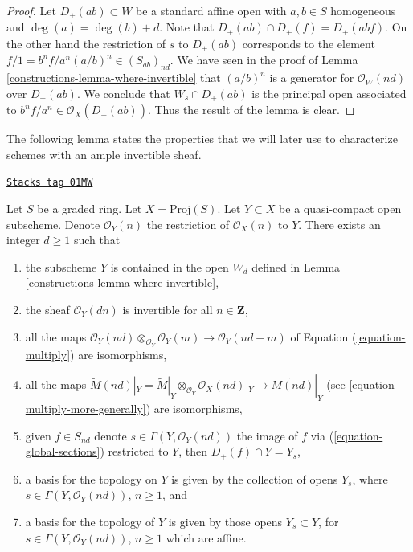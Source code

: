 \begin{proof}

Let $D_{+}(ab) \subset W$ be a standard affine open with
$a, b \in S$ homogeneous and $\deg(a) = \deg(b) + d$.
Note that $D_{+}(ab) \cap D_{+}(f) = D_{+}(abf)$.
On the other hand the restriction of $s$ to $D_{+}(ab)$
corresponds to the element $f/1 = b^nf/a^n (a/b)^n \in (S_{ab})_{nd}$.
We have seen in the proof of Lemma \ref{constructions-lemma-where-invertible} that
$(a/b)^n$ is a generator for $\mathcal{O}_W(nd)$ over $D_{+}(ab)$.
We conclude that $W_s \cap D_{+}(ab)$ is the principal open
associated to $b^nf/a^n \in \mathcal{O}_X(D_{+}(ab))$.
Thus the result of the lemma is clear.
\end{proof}

The following lemma states the properties that we will later use to
characterize schemes with an ample invertible sheaf.

\begin{lemma}
\label{constructions-lemma-ample-on-proj}
\href{https://stacks.math.columbia.edu/tag/01MW}{\texttt{Stacks tag 01MW}}

Let $S$ be a graded ring.
Let $X = \text{Proj}(S)$.
Let $Y \subset X$ be a quasi-compact open subscheme.
Denote $\mathcal{O}_Y(n)$ the restriction of
$\mathcal{O}_X(n)$ to $Y$.
There exists an integer $d \geq 1$ such that
\begin{enumerate}
\item the subscheme $Y$ is contained in the open $W_d$ defined
in Lemma \ref{constructions-lemma-where-invertible},
\item the sheaf $\mathcal{O}_Y(dn)$ is invertible for all $n \in \mathbf{Z}$,
\item all the maps
$\mathcal{O}_Y(nd) \otimes_{\mathcal{O}_Y} \mathcal{O}_Y(m)
\longrightarrow
\mathcal{O}_Y(nd + m)$
of Equation (\ref{equation-multiply}) are isomorphisms,
\item all the maps
$\widetilde M(nd)|_Y = \widetilde M|_Y \otimes_{\mathcal{O}_Y}
\mathcal{O}_X(nd)|_Y \to \widetilde{M(nd)}|_Y$
(see \ref{equation-multiply-more-generally}) are isomorphisms,
\item given $f \in S_{nd}$ denote $s \in \Gamma(Y, \mathcal{O}_Y(nd))$
the image of $f$ via (\ref{equation-global-sections})
restricted to $Y$, then $D_{+}(f) \cap Y = Y_s$,
\item a basis for the topology on $Y$ is given
by the collection of opens $Y_s$, where $s \in \Gamma(Y, \mathcal{O}_Y(nd))$,
$n \geq 1$, and
\item a basis for the topology of $Y$ is given
by those opens $Y_s \subset Y$, for
$s \in \Gamma(Y, \mathcal{O}_Y(nd))$, $n \geq 1$ which are affine.
\end{enumerate}
\end{lemma}

